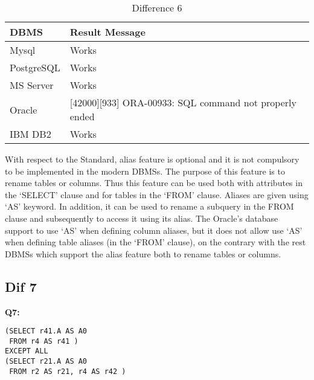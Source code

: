 \begin{table}[h]
\centering
\caption{Difference 6}
\label{my-label}
\begin{tabular}{|p{2cm}|p{11.5cm}| }
\hline
\textbf{DBMS} & \textbf{Result Message}                                        \\ \hline
Mysql         & Works                                                          \\ \hline
PostgreSQL    & Works                                                          \\ \hline
MS Server     & Works                                                          \\ \hline
Oracle        & {[}42000{]}{[}933{]} ORA-00933: SQL command not properly ended \\ \hline
IBM DB2       & Works                                                          \\ \hline
\end{tabular}
\end{table}

With respect to the Standard, alias feature is optional and it is not compulsory to be implemented in the modern DBMSs. The purpose of this feature is to rename tables or columns. Thus this feature can be used both with attributes in the ‘SELECT’ clause and for tables in the ‘FROM’ clause. Aliases are given using ‘AS’ keyword. In addition, it can be used to rename a subquery in the FROM clause and subsequently to access it using its alias. The Oracle’s database support to use ‘AS’ when defining column aliases, but it does not allow use ‘AS’ when defining table aliases (in the ‘FROM’ clause), on the contrary with the rest DBMSs which support the alias feature both to rename tables or columns. 


\subsection{Dif 7}
  
\textbf{Q7:}
\begin{mdframed}[backgroundcolor=lightgray!20]
\begin{lstlisting}[style=SQL]
(SELECT r41.A AS A0
 FROM r4 AS r41 ) 
EXCEPT ALL
(SELECT r21.A AS A0
 FROM r2 AS r21, r4 AS r42 )
\end{lstlisting}
\end{mdframed}

